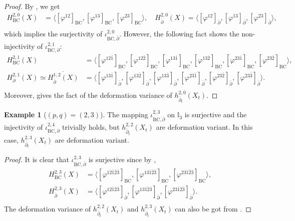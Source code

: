 \documentclass[12pt]{amsart}
\numberwithin{equation}{section}
\theoremstyle{definition}
\newtheorem{example}  [theorem]     {Example}
\theoremstyle{definition}
\theoremstyle{definition}
\renewcommand{\1}{\mathsf{1}}
\newcommand{\db}{\overline{\partial}}
\renewcommand{\>}{\rightarrow}
\newcommand{\p}{\partial}
\newcommand{\bp}{\overline\partial}
\def\p{\partial}
\theoremstyle{plain} %
\theoremstyle{plain} %
\theoremstyle{plain} %
\begin{document}
	\begin{proof}
		By \cite[p. 6]{Sc07}, we get
		\[ \begin{aligned}
			H^{2,0}_{\mathrm {BC}}(X) &= \langle[\varphi^{12}]_{\mathrm {BC}}, [\varphi^{13}]_{\mathrm {BC}},[\varphi^{23}]_{\mathrm {BC}} \rangle, \quad
			H^{2,0}_{\bp}(X)= \langle[\varphi^{12}]_{\bp}, [\varphi^{13}]_{\bp},[\varphi^{23}]_{\bp}\rangle, \\
		\end{aligned}\]
		which implies the surjectivity of $\iota^{2,0}_{\mathrm {BC},\bp}$. However, the following fact shows the non-injectivity of 	$\iota^{2,1}_{\mathrm {BC},\p}$:
		\[ \begin{aligned}
			H^{2,1}_{\mathrm {BC}}(X) &= \langle[\varphi^{12\bar{1}}]_{\mathrm {BC}}, [\varphi^{12\bar{2}}]_{\mathrm {BC}},[\varphi^{13\bar{1}}]_{\mathrm {BC}},[\varphi^{13\bar{2}}]_{\mathrm {BC}},[\varphi^{23\bar{1}}]_{\mathrm {BC}},[\varphi^{23\bar{2}}]_{\mathrm {BC}}\rangle, \\
			H^{2,1}_{\p}(X)\simeq{\overline{H_{\bp}^{1,2}(X)}} &= \langle[\varphi^{13\bar{1}}]_{\bp}, [\varphi^{13\bar{2}}]_{\bp},[\varphi^{13\bar{3}}]_{\bp},[\varphi^{23\bar{1}}]_{\bp}, [\varphi^{23\bar{2}}]_{\bp},[\varphi^{23\bar{3}}]_{\bp}\rangle. \\
		\end{aligned}\]
		Moreover, \cite[Appendix]{Ag13} gives the fact of the deformation variance of $h^{2,0}_{\db_t}(X_t).$
	\end{proof}
	\begin{example}[$(p,q)=(2,3)$]\label{example 3}
		The mapping $\iota^{2,3}_{\mathrm {BC},\bp}$ on $\mathbb{I}_3$ is surjective and  the injectivity of $\iota^{2,4}_{\mathrm {BC},\p}$  trivially holds,  but
		$h^{2,2}_{\db_t}(X_t)$ are deformation variant. In this case, $h^{2,3}_{\db_t}(X_t)$ are deformation variant.
	\end{example}
	\begin{proof}
		It is clear that $\iota^{2,3}_{\mathrm {BC},\bp}$ is surjective since by \cite[p. 6]{Sc07},
		\[ \begin{aligned}
			H^{2,3}_{\mathrm {BC}}(X) &= \langle[\varphi^{12\bar{1}\bar{2}\bar{3}}]_{\mathrm {BC}}, [\varphi^{13\bar{1}\bar{2}\bar{3}}]_{\mathrm {BC}},[\varphi^{23\bar{1}\bar{2}\bar{3}}]_{\mathrm {BC}} \rangle, \\
			H^{2,3}_{\bp}(X) &= \langle[\varphi^{12\bar{1}\bar{2}\bar{3}}]_{\bp}, [\varphi^{13\bar{1}\bar{2}\bar{3}}]_{\bp},[\varphi^{23\bar{1}\bar{2}\bar{3}}]_{\bp}\rangle. \\
		\end{aligned}\]
		The deformation variance of $h^{2,2}_{\db_t}(X_t)$ and $h^{2,3}_{\db_t}(X_t)$ can also be got from \cite[Appendix]{Ag13}.
	\end{proof}
	
\end{document}
